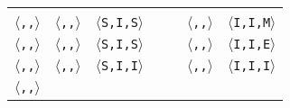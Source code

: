 \begin{tabular}{|c|c|c|c|c|c|c|}
&
&

&%
&%
\\
\cline{1-3}
\cline{6-7}

\texttt{$\langle$\benchi{},\benchi{},\benchm{}$\rangle$}

& \texttt{$\langle$\benchs{},\benchi{},\benchx{}$\rangle$}
& \texttt{$\langle$S,I,S$\rangle$}

&
&

& \texttt{$\langle$\benchi{},\benchi{},\benchm{}$\rangle$}
& \texttt{$\langle$I,I,M$\rangle$}
\\
\cline{1-3}
\cline{6-7}

\texttt{$\langle$\benchi{},\benchi{},\benche{}$\rangle$}

& \texttt{$\langle$\benchs{},\benchi{},\benchx{}$\rangle$}
& \texttt{$\langle$S,I,S$\rangle$}

&
&

& \texttt{$\langle$\benchi{},\benchi{},\benche{}$\rangle$}
& \texttt{$\langle$I,I,E$\rangle$}
\\
\cline{1-3}
\cline{6-7}

\texttt{$\langle$\benchs{},\benchi{},\benchi{}$\rangle$}

& \texttt{$\langle$\benchs{},\benchi{},\benchi{}$\rangle$}
& \texttt{$\langle$S,I,I$\rangle$}

&
&

& \texttt{$\langle$\benchi{},\benchi{},\benchi{}$\rangle$}
& \texttt{$\langle$I,I,I$\rangle$}
\\
\cline{1-3}
\cline{6-7}

\texttt{$\langle$\benchx{},\benchs{},\benchi{}$\rangle$}


\end{tabular}
